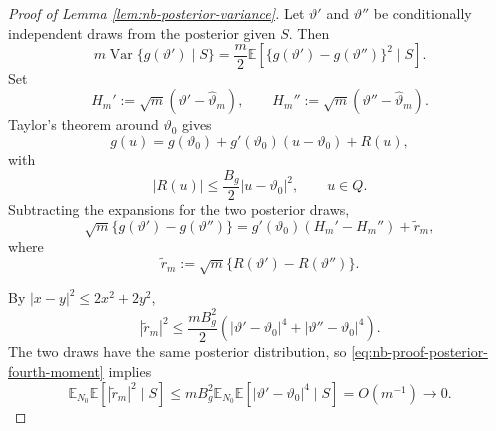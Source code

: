 \documentclass{article}
\theoremstyle{named}
\theoremstyle{named1}
\theoremstyle{plain}
\theoremstyle{remark}
\begin{document}
\begin{proof}[Proof of Lemma \ref{lem:nb-posterior-variance}]
Let \(\vartheta'\) and \(\vartheta''\) be conditionally independent
draws from the posterior given \(S\). Then
\begin{equation}
    m\operatorname{Var}\{g(\vartheta')\mid S\}
    =
    \frac m2
    \mathbb E
    \left[
        \{g(\vartheta')-g(\vartheta'')\}^2
        \mid S
    \right].
    \label{eq:nb-proof-two-draw-identity}
\end{equation}
Set
\[
    H_m'
    :=
    \sqrt m(\vartheta'-\widehat\vartheta_m),
    \qquad
    H_m''
    :=
    \sqrt m(\vartheta''-\widehat\vartheta_m).
\]
Taylor's theorem around \(\vartheta_0\) gives
\[
    g(u)
    =
    g(\vartheta_0)
    +
    g'(\vartheta_0)(u-\vartheta_0)
    +
    R(u),
\]
with
\[
    |R(u)|
    \leq
    \frac{B_g}{2}|u-\vartheta_0|^2,
    \qquad u\in Q.
\]
Subtracting the expansions for the two posterior draws,
\begin{equation}
    \sqrt m
    \{g(\vartheta')-g(\vartheta'')\}
    =
    g'(\vartheta_0)(H_m'-H_m'')
    +
    \widetilde r_m,
    \label{eq:nb-proof-two-draw-linearization}
\end{equation}
where
\[
    \widetilde r_m
    :=
    \sqrt m\{R(\vartheta')-R(\vartheta'')\}.
\]

By \(|x-y|^2\leq2x^2+2y^2\),
\[
    |\widetilde r_m|^2
    \leq
    \frac{mB_g^2}{2}
    \left(
        |\vartheta'-\vartheta_0|^4
        +
        |\vartheta''-\vartheta_0|^4
    \right).
\]
The two draws have the same posterior distribution, so
\eqref{eq:nb-proof-posterior-fourth-moment} implies
\begin{equation}
    \mathbb E_{N_0}
    \mathbb E[
        |\widetilde r_m|^2
        \mid S
    ]
    \leq
    mB_g^2
    \mathbb E_{N_0}
    \mathbb E[
        |\vartheta'-\vartheta_0|^4
        \mid S
    ]
    =
    O(m^{-1})
    \rightarrow0.
    \label{eq:nb-proof-functional-remainder}
\end{equation}


\end{proof}
\end{document}
